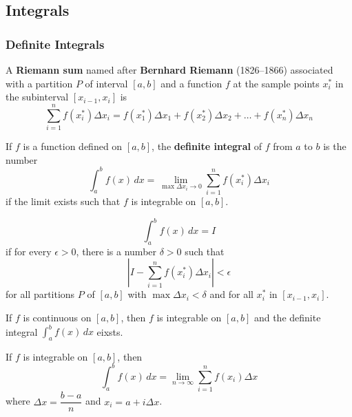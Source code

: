 \subsection{Integrals}

\subsubsection*{Definite Integrals}
A \textbf{Riemann sum} named after \textbf{Bernhard Riemann} (1826--1866)
associated with a partition \(P\) of interval \([a,b]\) and a function \(f\)
at the sample points \(x_i^*\) in the subinterval \([x_{i-1},x_i]\) is
\[\sum_{i=1}^n f(x_i^*)\Delta x_i=f(x_1^*)\Delta x_1+f(x_2^*)\Delta x_2
+\dots+f(x_n^*)\Delta x_n\]
\begin{definition}
    If \(f\) is a function defined on \([a,b]\),
    the \textbf{definite integral} of \(f\) from \(a\) to \(b\) is the number
    \[\int_a^b f(x)\,dx=\lim_{\max\Delta x_i\to 0}
    \sum_{i=1}^n f(x_i^*)\Delta x_i\]
    if the limit exists such that \(f\) is integrable on \([a,b]\).
\end{definition}
\begin{definition}
    \[\int_a^b f(x)\,dx=I\]
    if for every \(\epsilon>0\), there is a number \(\delta>0\) such that
    \[\left\lvert I-\sum_{i=1}^n f(x_i^*)\Delta x_i\right\rvert<\epsilon\]
    for all partitions \(P\) of \([a,b]\) with \(\max\Delta x_i<\delta\) and
    for all \(x_i^*\) in \([x_{i-1},x_i]\).
\end{definition}
\begin{theorem}
    If \(f\) is continuous on \([a,b]\), then \(f\) is integrable on \([a,b]\)
    and the definite integral \(\displaystyle{\int_a^b f(x)\,dx}\) eixsts.
\end{theorem}
\begin{theorem}
    If \(f\) is integrable on \([a,b]\), then
    \[\int_a^b f(x)\,dx=\lim_{n\to\infty}\sum_{i=1}^nf(x_i)\Delta x\]
    where \(\Delta x=\dfrac{b-a}{n}\) and \(x_i=a+i\Delta x\).
\end{theorem}

